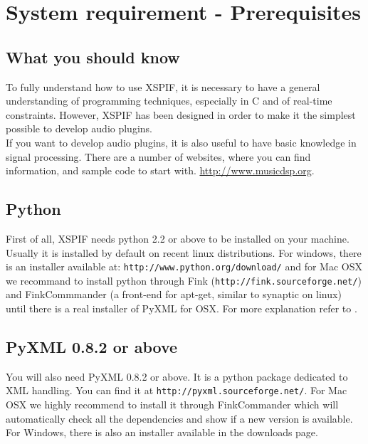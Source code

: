 
\chapter{System requirement - Prerequisites}

\section{What you should know}
\noindent To fully understand how to use XSPIF, it is necessary to
have a general understanding of programming techniques, especially in
C and of real-time constraints. However, XSPIF has been designed in order to make it the simplest possible to develop audio plugins.\\
\noindent If you want to develop audio plugins, it is also useful to
have basic knowledge in signal processing. There are a number of
websites, where you can find information, and sample code to start
with. \url{http://www.musicdsp.org}.


\section{Python}
\noindent First of all, XSPIF needs python 2.2 or above to be installed
on your machine. Usually it is installed by default on recent linux
distributions. For windows, there is an installer available at:
\verb|http://www.python.org/download/|
and for Mac OSX we recommand to install python through Fink
(\verb|http://fink.sourceforge.net/|) and FinkCommmander (a front-end for
apt-get, similar to synaptic on linux) until there is a real installer
of PyXML for OSX.  
For more explanation refer to \cite{python:site}.

\section{PyXML 0.8.2 or above}
\noindent You will also need PyXML 0.8.2 or above. It is a python
package dedicated to XML handling. You can find it at
\verb|http://pyxml.sourceforge.net/|. For Mac OSX we highly recommend
to install it through FinkCommander which will automatically check all
the dependencies and show if a new version is available. For Windows,
there is also an installer available in the downloads page.

